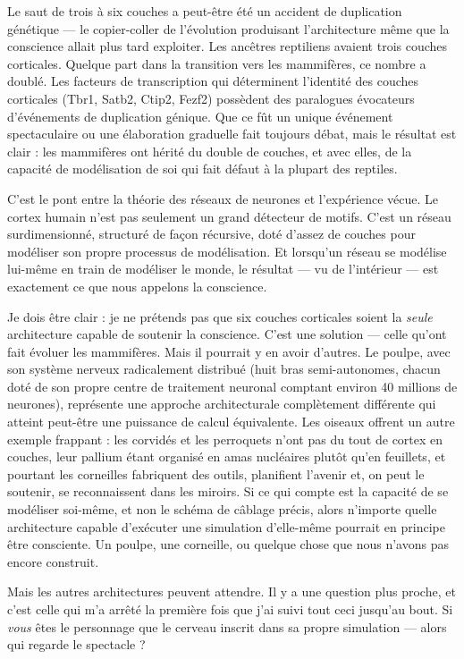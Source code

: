 \documentclass[11pt, twoside, openright]{book}
\begin{document}
Le saut de trois à six couches a peut-être été un accident de duplication génétique --- le copier-coller de l'évolution produisant l'architecture même que la conscience allait plus tard exploiter. Les ancêtres reptiliens avaient trois couches corticales. Quelque part dans la transition vers les mammifères, ce nombre a doublé. Les facteurs de transcription qui déterminent l'identité des couches corticales (Tbr1, Satb2, Ctip2, Fezf2) possèdent des paralogues évocateurs d'événements de duplication génique. Que ce fût un unique événement spectaculaire ou une élaboration graduelle fait toujours débat, mais le résultat est clair : les mammifères ont hérité du double de couches, et avec elles, de la capacité de modélisation de soi qui fait défaut à la plupart des reptiles.

C'est le pont entre la théorie des réseaux de neurones et l'expérience vécue. Le cortex humain n'est pas seulement un grand détecteur de motifs. C'est un réseau surdimensionné, structuré de façon récursive, doté d'assez de couches pour modéliser son propre processus de modélisation. Et lorsqu'un réseau se modélise lui-même en train de modéliser le monde, le résultat --- vu de l'intérieur --- est exactement ce que nous appelons la conscience.

Je dois être clair : je ne prétends pas que six couches corticales soient la \textit{seule} architecture capable de soutenir la conscience. C'est une solution --- celle qu'ont fait évoluer les mammifères. Mais il pourrait y en avoir d'autres. Le poulpe, avec son système nerveux radicalement distribué (huit bras semi-autonomes, chacun doté de son propre centre de traitement neuronal comptant environ 40 millions de neurones), représente une approche architecturale complètement différente qui atteint peut-être une puissance de calcul équivalente. Les oiseaux offrent un autre exemple frappant : les corvidés et les perroquets n'ont pas du tout de cortex en couches, leur pallium étant organisé en amas nucléaires plutôt qu'en feuillets, et pourtant les corneilles fabriquent des outils, planifient l'avenir et, on peut le soutenir, se reconnaissent dans les miroirs. Si ce qui compte est la capacité de se modéliser soi-même, et non le schéma de câblage précis, alors n'importe quelle architecture capable d'exécuter une simulation d'elle-même pourrait en principe être consciente. Un poulpe, une corneille, ou quelque chose que nous n'avons pas encore construit.

Mais les autres architectures peuvent attendre. Il y a une question plus proche, et c'est celle qui m'a arrêté la première fois que j'ai suivi tout ceci jusqu'au bout. Si \textit{vous} êtes le personnage que le cerveau inscrit dans sa propre simulation --- alors qui regarde le spectacle ?
\end{document}
